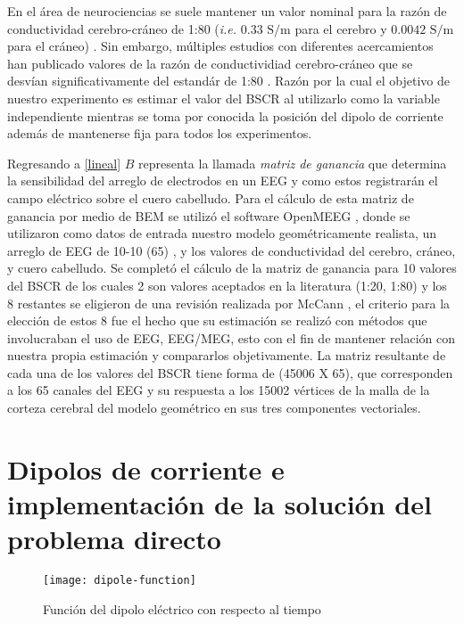 En el área de neurociencias se suele mantener un valor nominal para la razón de conductividad cerebro-cráneo de 1:80 (\emph{i.e.} $0.33\text{ S/m}$ para el cerebro y $0.0042 \text{ S/m}$ para el cráneo) \cite{Rush1968,Rush1969,Cohen1983}. Sin embargo, múltiples estudios con diferentes acercamientos han publicado valores de la razón de conductividiad cerebro-cráneo que se desvían significativamente del estandár de 1:80 \cite{McCann2019}. Razón por la cual el objetivo de nuestro experimento es estimar el valor del BSCR al utilizarlo como la variable independiente mientras se toma por conocida la posición del dipolo de corriente además de mantenerse fija para todos los experimentos.

Regresando a \cref{lineal} $B$ representa la llamada \emph{matriz de ganancia} que determina la sensibilidad del arreglo de electrodos en un EEG y como estos registrarán el campo eléctrico sobre el cuero cabelludo. Para el cálculo de esta matriz de ganancia por medio de BEM se utilizó el software OpenMEEG \cite{open,open2}, donde se utilizaron como datos de entrada nuestro modelo geométricamente realista, un arreglo de EEG de 10-10 (65) , y los valores de conductividad del cerebro, cráneo, y cuero cabelludo. Se completó el cálculo de la matriz de ganancia para 10  valores del BSCR de los cuales 2 son valores aceptados en la literatura (1:20, 1:80) y los 8 restantes se eligieron de una revisión realizada por McCann \cite{McCann2019}, el criterio para la elección de estos 8 fue el hecho que su estimación se realizó con métodos que involucraban el uso de EEG, EEG/MEG, esto con el fin de mantener relación con nuestra propia estimación y compararlos objetivamente. La matriz resultante de cada una de los valores del BSCR tiene forma de (45006 X 65), que corresponden a los 65 canales del EEG y su respuesta a los 15002 vértices de la malla de la corteza cerebral del modelo geométrico en sus tres componentes vectoriales.

\section{Dipolos de corriente e implementación de la solución del problema directo}
\label{sec:methodology:direct_solved}


\begin{figure}[tb]
	\centering
	\texttt{[image: dipole-function]}
	\caption{Función del dipolo eléctrico con respecto al tiempo }
	\label{fig:methodology:dipole}
\end{figure}

